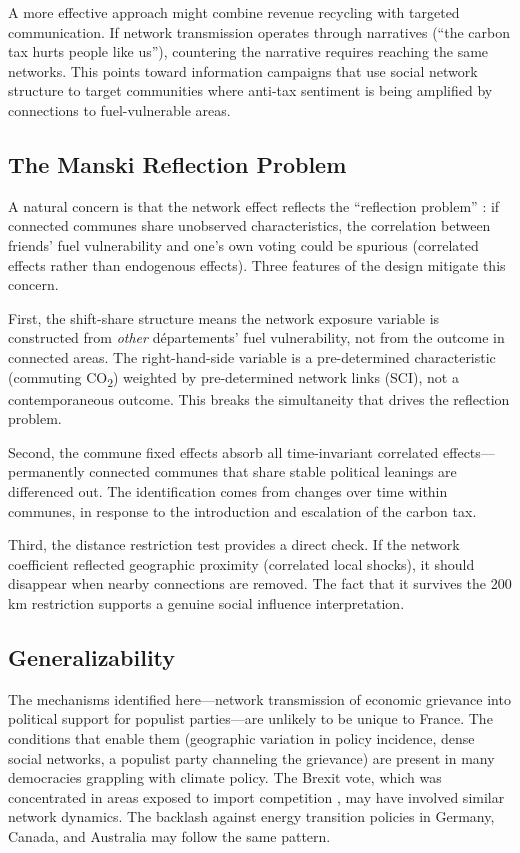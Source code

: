 \documentclass[12pt]{article}
\newcommand{\depts}{d\'{e}partements}
\begin{document}
A more effective approach might combine revenue recycling with targeted communication. If network transmission operates through narratives (``the carbon tax hurts people like us''), countering the narrative requires reaching the same networks. This points toward information campaigns that use social network structure to target communities where anti-tax sentiment is being amplified by connections to fuel-vulnerable areas.

\subsection{The Manski Reflection Problem}

A natural concern is that the network effect reflects the ``reflection problem'' \citep{manski1993identification}: if connected communes share unobserved characteristics, the correlation between friends' fuel vulnerability and one's own voting could be spurious (correlated effects rather than endogenous effects). Three features of the design mitigate this concern.

First, the shift-share structure means the network exposure variable is constructed from \emph{other} \depts{}' fuel vulnerability, not from the outcome in connected areas. The right-hand-side variable is a pre-determined characteristic (commuting CO\textsubscript{2}) weighted by pre-determined network links (SCI), not a contemporaneous outcome. This breaks the simultaneity that drives the reflection problem.

Second, the commune fixed effects absorb all time-invariant correlated effects---permanently connected communes that share stable political leanings are differenced out. The identification comes from changes over time within communes, in response to the introduction and escalation of the carbon tax.

Third, the distance restriction test provides a direct check. If the network coefficient reflected geographic proximity (correlated local shocks), it should disappear when nearby connections are removed. The fact that it survives the 200 km restriction supports a genuine social influence interpretation.

\subsection{Generalizability}

The mechanisms identified here---network transmission of economic grievance into political support for populist parties---are unlikely to be unique to France. The conditions that enable them (geographic variation in policy incidence, dense social networks, a populist party channeling the grievance) are present in many democracies grappling with climate policy. The Brexit vote, which was concentrated in areas exposed to import competition \citep{colantone2018trade, fetzer2019did}, may have involved similar network dynamics. The backlash against energy transition policies in Germany, Canada, and Australia may follow the same pattern.
\end{document}
